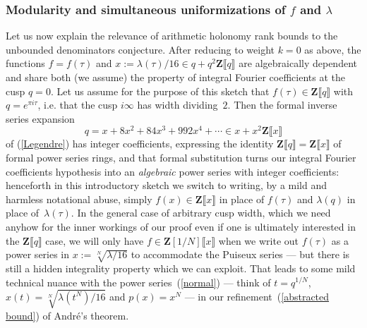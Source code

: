 \documentclass[10pt]{amsart}
\def\Z{\mathbf{Z}}
\theoremstyle{remark}
\numberwithin{equation}{subsection}
\begin{document}
\subsubsection{Modularity and simultaneous uniformizations of $f$ and $\lambda$}
Let us now explain the relevance of arithmetic holonomy rank bounds to the unbounded denominators conjecture.
After reducing to weight $k = 0$ as above, the functions $f = f(\tau)$ and $x := \lambda(\tau) / 16 \in q + q^2 \Z\llbracket q\rrbracket$ are algebraically dependent and share both (we assume) the property of integral Fourier coefficients at the  cusp $q = 0$. Let us assume for the purpose of this sketch that $f(\tau) \in \Z\llbracket q \rrbracket$ with~$q = e^{\pi i \tau}$, i.e. that the cusp $i\infty$ has width dividing~$2$. Then the formal inverse series expansion 
$$
q 
= x + 8x^2 + 84x^3 + 992 x^4 + \cdots \in x
+ x^2 \Z\llbracket x\rrbracket
$$
	 of (\ref{Legendre}) has integer coefficients, expressing the identity $\Z\llbracket q \rrbracket = \Z\llbracket x \rrbracket$ of formal power series rings, and that formal substitution turns our integral Fourier coefficients hypothesis into an \emph{algebraic} power series with integer coefficients: henceforth in this introductory sketch we switch to writing, by a mild and harmless notational abuse, simply $f(x) \in \Z\llbracket x \rrbracket$ in place of $f(\tau)$ and $\lambda(q)$ in place of~$\lambda(\tau)$. In the general case of arbitrary cusp width, which we need anyhow for the inner workings of our proof even if one is ultimately interested in the $\Z\llbracket q \rrbracket$ case, we will only have $f \in \Z[1/N]\llbracket x \rrbracket$ when we write out $f(\tau)$ as a power series in $x := \sqrt[N]{\lambda/16}$ to accommodate the Puiseux series --- but there is still a hidden integrality property which we can exploit. That leads to some mild technical nuance with the power series~(\ref{normal}) --- think of $t = q^{1/N}$,
$x(t) = \sqrt[N]{\lambda(t^N)/16}$ and $p(x) = x^N$ --- in our refinement~(\ref{abstracted bound}) of Andr\'e's theorem. 
\end{document}
